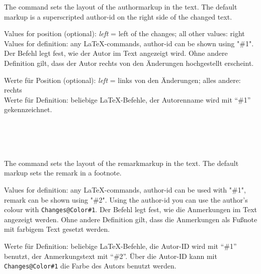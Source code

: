 \DescribeMacro{\setauthormarkup}
\ifENGLISH
	The command  sets the layout of the authormarkup in the text.
	The default markup is a superscripted author-id on the right side of the changed text.

	Values for position (optional): \emph{left} = left of the changes; all other values: right\\
	Values for definition: any \LaTeX-commands, author-id can be shown using "\#1".
\fi
	\ifGERMAN
		Der Befehl  legt fest, wie der Autor im Text angezeigt wird.
		Ohne andere Definition gilt, dass der Autor rechts von den Änderungen hochgestellt erscheint.

		Werte für Position (optional): \emph{left} = links von den Änderungen; alles andere: rechts\\
		Werte für Definition: beliebige \LaTeX-Befehle, der Autorenname wird mit "`\#1"' gekennzeichnet.
	\fi
\begin{einspiel}
	\>
\end{einspiel}
\begin{einspiel}[true]
	\>\\
	\>\\
	\>\\
	\>
\end{einspiel}

\DescribeMacro{\setremarkmarkup}
\ifENGLISH
	The command  sets the layout of the remarkmarkup in the text.
	The default markup sets the remark in a footnote.

	Values for definition: any \LaTeX-commands, author-id can be used with "\#1", remark can be shown using "\#2".
	Using the author-id you can use the author's colour with \texttt{Changes@Color\#1}.
\fi
	\ifGERMAN
		Der Befehl  legt fest, wie die Anmerkungen im Text angezeigt werden.
		Ohne andere Definition gilt, dass die Anmerkungen als Fußnote mit farbigem Text gesetzt werden.

		Werte für Definition: beliebige \LaTeX-Befehle, die Autor-ID wird mit "`\#1"' benutzt, der Anmerkungstext mit "`\#2"'.
		Über die Autor-ID kann mit \texttt{Changes@Color\#1} die Farbe des Autors benutzt werden.
	\fi
\begin{einspiel}
	\>
\end{einspiel}
\begin{einspiel}[true]
	\>\\
	\>
\end{einspiel}

